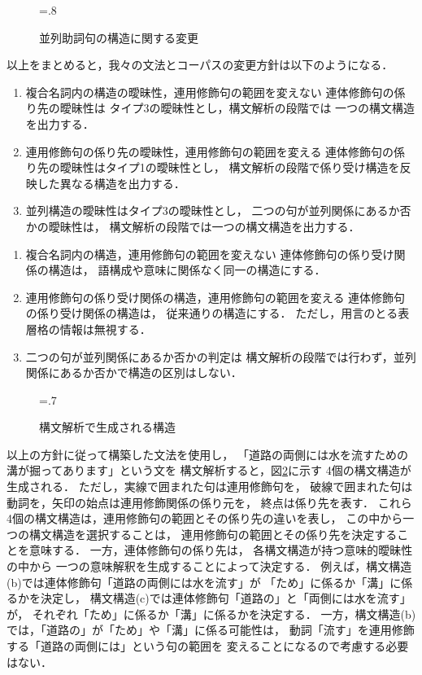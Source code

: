 \begin{figure}[tp]
  \centering
  \epsfxsize=.8\textwidth
  \caption{並列助詞句の構造に関する変更}
  \label{fig:convert_para_pp}
\end{figure}


以上をまとめると，我々の文法とコーパスの変更方針は以下のようになる．
\begin{enumerate}
\item 複合名詞内の構造の曖昧性，連用修飾句の範囲を変えない
  連体修飾句の係り先の曖昧性は
  タイプ3の曖昧性とし，構文解析の段階では
  一つの構文構造を出力する．
\item 連用修飾句の係り先の曖昧性，連用修飾句の範囲を変える
  連体修飾句の係り先の曖昧性はタイプ1の曖昧性とし，
  構文解析の段階で係り受け構造を反映した異なる構造を出力する．
\item 並列構造の曖昧性はタイプ3の曖昧性とし，
  二つの句が並列関係にあるか否かの曖昧性は，
  構文解析の段階では一つの構文構造を出力する．
\end{enumerate}
\fi
\begin{enumerate}
\item 複合名詞内の構造，連用修飾句の範囲を変えない
  連体修飾句の係り受け関係の構造は，
  語構成や意味に関係なく同一の構造にする．
\item 連用修飾句の係り受け関係の構造，連用修飾句の範囲を変える
  連体修飾句の係り受け関係の構造は，
  従来通りの構造にする．
  ただし，用言のとる表層格の情報は無視する．
\item 二つの句が並列関係にあるか否かの判定は
  構文解析の段階では行わず，並列関係にあるか否かで構造の区別はしない．
\end{enumerate}

\begin{figure}[tp]
  \centering
  \epsfxsize=.7\textwidth
  \caption{構文解析で生成される構造}
  \label{fig:example_of_policy}
\end{figure}

以上の方針に従って構築した文法を使用し，
「道路の両側には水を流すための溝が掘ってあります」という文を
構文解析すると，図\ref{fig:example_of_policy}に示す
4個の構文構造が生成される．
ただし，実線で囲まれた句は連用修飾句を，
破線で囲まれた句は動詞を，矢印の始点は連用修飾関係の係り元を，
終点は係り先を表す．
これら4個の構文構造は，連用修飾句の範囲とその係り先の違いを表し，
この中から一つの構文構造を選択することは，
連用修飾句の範囲とその係り先を決定することを意味する．
一方，連体修飾句の係り先は，
各構文構造が持つ意味的曖昧性の中から
一つの意味解釈を生成することによって決定する．
例えば，構文構造(b)では連体修飾句「道路の両側には水を流す」が
「ため」に係るか「溝」に係るかを決定し，
構文構造(c)では連体修飾句「道路の」と「両側には水を流す」が，
それぞれ「ため」に係るか「溝」に係るかを決定する．
一方，構文構造(b)では，「道路の」が「ため」や「溝」に係る可能性は，
動詞「流す」を連用修飾する「道路の両側には」という句の範囲を
変えることになるので考慮する必要はない．

